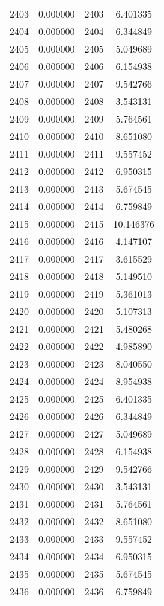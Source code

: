 \documentclass[12pt]{article}
\begin{document}
\begin{longtable}{@{}cccc@{}}
2403 & 0.000000 & 2403 & 6.401335 \\
2404 & 0.000000 & 2404 & 6.344849 \\
2405 & 0.000000 & 2405 & 5.049689 \\
2406 & 0.000000 & 2406 & 6.154938 \\
2407 & 0.000000 & 2407 & 9.542766 \\
2408 & 0.000000 & 2408 & 3.543131 \\
2409 & 0.000000 & 2409 & 5.764561 \\
2410 & 0.000000 & 2410 & 8.651080 \\
2411 & 0.000000 & 2411 & 9.557452 \\
2412 & 0.000000 & 2412 & 6.950315 \\
2413 & 0.000000 & 2413 & 5.674545 \\
2414 & 0.000000 & 2414 & 6.759849 \\
2415 & 0.000000 & 2415 & 10.146376 \\
2416 & 0.000000 & 2416 & 4.147107 \\
2417 & 0.000000 & 2417 & 3.615529 \\
2418 & 0.000000 & 2418 & 5.149510 \\
2419 & 0.000000 & 2419 & 5.361013 \\
2420 & 0.000000 & 2420 & 5.107313 \\
2421 & 0.000000 & 2421 & 5.480268 \\
2422 & 0.000000 & 2422 & 4.985890 \\
2423 & 0.000000 & 2423 & 8.040550 \\
2424 & 0.000000 & 2424 & 8.954938 \\
2425 & 0.000000 & 2425 & 6.401335 \\
2426 & 0.000000 & 2426 & 6.344849 \\
2427 & 0.000000 & 2427 & 5.049689 \\
2428 & 0.000000 & 2428 & 6.154938 \\
2429 & 0.000000 & 2429 & 9.542766 \\
2430 & 0.000000 & 2430 & 3.543131 \\
2431 & 0.000000 & 2431 & 5.764561 \\
2432 & 0.000000 & 2432 & 8.651080 \\
2433 & 0.000000 & 2433 & 9.557452 \\
2434 & 0.000000 & 2434 & 6.950315 \\
2435 & 0.000000 & 2435 & 5.674545 \\
2436 & 0.000000 & 2436 & 6.759849 \\

\end{longtable}
\end{document}
